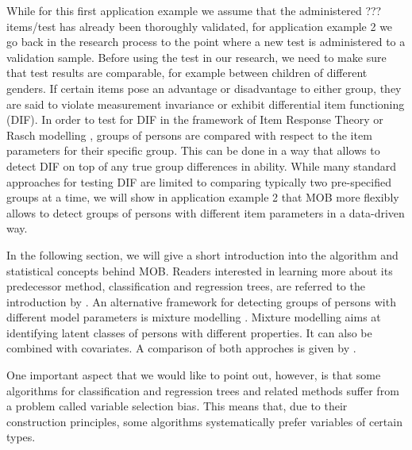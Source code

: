 \documentclass[doc,floatsintext,natbib]{apa7}
\begin{document}

While for this first application example we assume that the administered ??? items/test has already been thoroughly validated, for application example 2 we go back in the research process to the point where a new test is administered to a validation sample. Before using the test in our research, we need to make sure that test results are comparable, for example between children of different genders. If certain items pose an advantage or disadvantage to either group, they are said to violate measurement invariance or exhibit differential item functioning (DIF). In order to test for DIF in the framework of Item Response Theory or Rasch modelling \cite{AnthyDiPe16,DebStrZei:2022:CRC,Mall97}, groups of persons are compared with respect to the item parameters for their specific group. This can be done in a way that allows to detect DIF on top of any true group differences in ability. While many standard approaches for testing DIF are limited to comparing typically two pre-specified groups at a time, we will show in application example 2 that MOB more flexibly allows to detect groups of persons with different item parameters in a data-driven way. 

In the following section, we will give a short introduction into the algorithm and statistical concepts behind MOB. Readers interested in learning more about its predecessor method, classification and regression trees, are referred to the introduction by \citet{StrMalTut:2009:PM}. An alternative framework for detecting groups of persons with different model parameters is mixture modelling \citep[see, e.g.,][in the context of Rasch modelling]{AyalySant17,FriStrZei:2015:EaPM}. Mixture modelling aims at identifying latent classes of persons with different properties. It can also be combined with covariates. A comparison of both approches is given by \citet{FriStrZei:2014}.


One important aspect that we would like to point out, however, is that some algorithms for classification and regression trees and related methods suffer from a problem called variable selection bias. This means that, due to their construction principles, some algorithms systematically prefer variables of certain types. 
\end{document}
